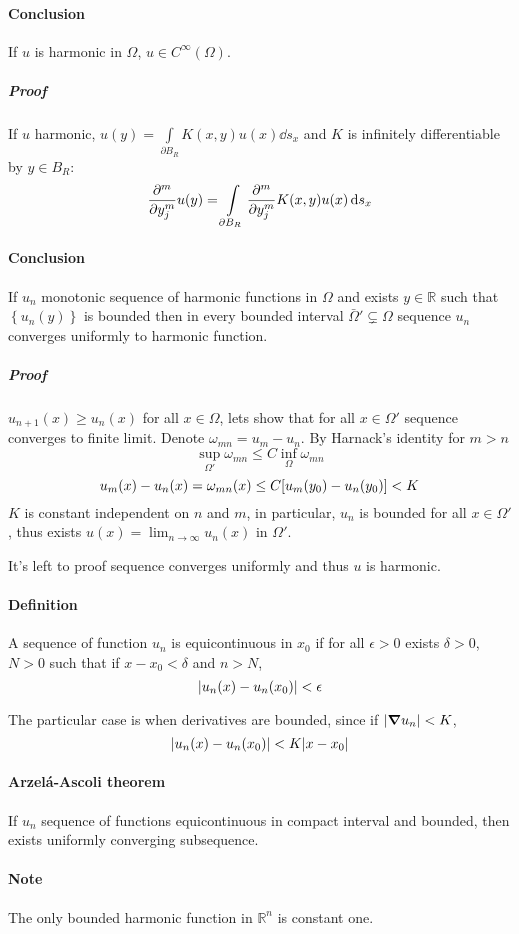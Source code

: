 \paragraph{Conclusion}
If $u$ is harmonic in $\Omega$, $u\in C^\infty(\Omega)$.
\subparagraph{Proof}
If $u$ harmonic, $u(y) = \int\limits_{\partial B_R} K(x,y)u(x) \dd{s_x} $ and $K$ is infinitely differentiable by $y\in B_R$:
$$\pdv[m]{y_j} u(y) = \int\limits_{\partial B_R} \pdv[m]{y_j} K(x,y)u(x) \dd{s_x} $$
\paragraph{Conclusion}
If $u_n$ monotonic sequence of harmonic functions in $\Omega$ and exists $y\in \mathbb{R}$ such that $\left\{ u_n(y)\right\}$ is bounded then in every bounded interval $\bar{\Omega}' \subsetneq \Omega$ sequence $u_n$ converges uniformly to harmonic function.
\subparagraph{Proof}
$u_{n+1}(x) \geq u_n(x)$ for all $x\in \Omega$, lets show that for all $x\in \Omega'$ sequence converges to finite limit. Denote $\omega_{mn} = u_m - u_n$. By Harnack's identity for $m>n$
$$\sup\limits_{\Omega'} \omega_{mn} \leq C \inf\limits_\Omega \omega_{mn}$$
$$u_m(x) - u_n(x) = \omega_{mn}(x) \leq C\qty[u_m(y_0)-u_n(y_0)] < K$$
$K$ is constant independent on $n$ and $m$, in particular, $u_n$ is bounded for all $x\in \Omega'$, thus exists $u(x) = \lim_{n \to \infty} u_n(x)$ in $\Omega'$.

It's left to proof sequence converges uniformly and thus $u$ is harmonic.
\paragraph{Definition} A sequence of function $u_n$ is equicontinuous in $x_0$ if for all $\epsilon>0$ exists $\delta>0$, $N>0$ such that if $x-x_0<\delta$ and $n>N$, 
$$\abs{u_n(x) - u_n(x_0)} < \epsilon$$

The particular case is when derivatives are bounded, since if $\abs{\grad u_n} < K$,
$$\abs{u_n(x) - u_n(x_0)} < K\abs{x-x_0}$$
\paragraph{Arzel\'{a}-Ascoli theorem }
If $u_n$ sequence of functions equicontinuous  in compact interval and bounded, then exists uniformly converging subsequence.
\paragraph{Note} The only bounded harmonic function in $\mathbb{R}^n$ is constant one.
